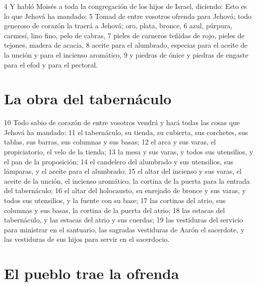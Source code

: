 4 Y habló Moisés a toda la congregación de los hijos de Israel, diciendo: Esto es lo que Jehová ha mandado:
5 Tomad de entre vosotros ofrenda para Jehová; todo generoso de corazón la traerá a Jehová; oro, plata, bronce,
6 azul, púrpura, carmesí, lino fino, pelo de cabras,
7 pieles de carneros teñidas de rojo, pieles de tejones, madera de acacia,
8 aceite para el alumbrado, especias para el aceite de la unción y para el incienso aromático,
9 y piedras de ónice y piedras de engaste para el efod y para el pectoral.

\section{La obra del tabernáculo}

10 Todo sabio de corazón de entre vosotros vendrá y hará todas las cosas que Jehová ha mandado:
11 el tabernáculo, su tienda, su cubierta, sus corchetes, sus tablas, sus barras, sus columnas y sus basas;
12 el arca y sus varas, el propiciatorio, el velo de la tienda;
13 la mesa y sus varas, y todos sus utensilios, y el pan de la proposición;
14 el candelero del alumbrado y sus utensilios, sus lámparas, y el aceite para el alumbrado;
15 el altar del incienso y sus varas, el aceite de la unción, el incienso aromático, la cortina de la puerta para la entrada del tabernáculo;
16 el altar del holocausto, su enrejado de bronce y sus varas, y todos sus utensilios, y la fuente con su base;
17 las cortinas del atrio, sus columnas y sus basas, la cortina de la puerta del atrio;
18 las estacas del tabernáculo, y las estacas del atrio y sus cuerdas;
19 las vestiduras del servicio para ministrar en el santuario, las sagradas vestiduras de Aarón el sacerdote, y las vestiduras de sus hijos para servir en el sacerdocio.

\section{El pueblo trae la ofrenda}

